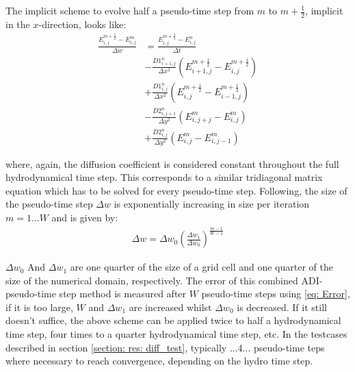 The implicit scheme to evolve half a pseudo-time step from $m$ to $m + \frac{1}{2}$, implicit in the $x$-direction, looks like:
\begin{align}
\frac{E_{i,j}^{m+\frac{1}{2}} - E_{i,j}^{m}}{\Delta w} 
 &= \frac{E_{i,j}^{m+\frac{1}{2}} - E_{i,j}^{n}}{\Delta t} \\
 &- \frac{D1_{i+1,j}^{n}}{\Delta x^2} (E_{i+1,j}^{m+\frac{1}{2}} - E_{i,j}^{m+\frac{1}{2}}) \\
 &+ \frac{D1_{i,j}^{n}}{\Delta x^2} (E_{i,j}^{m+\frac{1}{2}} - E_{i-1,j}^{m+\frac{1}{2}}) \\
 &- \frac{D2_{i,j+1}^{n}}{\Delta y^2} (E_{i,j+j}^{m} - E_{i,j}^{m}) \\
 &+ \frac{D2_{i,j}^{n}}{\Delta y^2} (E_{i,j}^{m} - E_{i,j-1}^{m})
\end{align}

where, again, the diffusion coefficient is considered constant throughout the full hydrodynamical time step. This corresponds to a similar tridiagonal matrix equation which has to be solved for every pseudo-time step. Following, the size of the pseudo-time step $\Delta w$ is exponentially increasing in size per iteration $m = 1 ... W$ and is given by:
\begin{align}
\Delta w = \Delta w_0 \left(\frac{\Delta w_1}{\Delta w_0} \right)^\frac{m-1}{W-1}
\end{align}

$\Delta w_0$ And $\Delta w_1$ are one quarter of the size of a grid cell and one quarter of the size of the numerical domain, respectively. The error of this combined ADI-pseudo-time step method is measured after $W$ pseudo-time steps using \eqref{eq: Error}, if it is too large, $W$ and $\Delta w_1$ are increased whilst $\Delta w_0$ is decreased. If it still doesn't suffice, the above scheme can be applied twice to half a hydrodynamical time step, four times to a quarter hydrodynamical time step, etc. In the testcases described in section \ref{section: res: diff_test}, typically ...4... pseudo-time teps where necessary to reach convergence, depending on the hydro time step.

